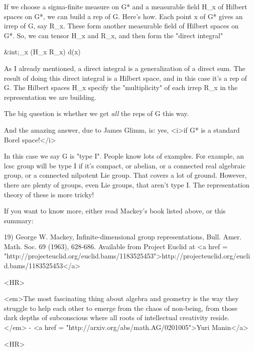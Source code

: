 If we choose a sigma-finite measure \mu  on G* and a measurable field
H_{x} of Hilbert spaces on G*, we can build a rep of G.
Here's how.  Each point x of G* gives an irrep of G, say
R_{x}.  These form another measurable field of Hilbert spaces
on G*.  So, we can tensor H_{x} and R_{x}, and then
form the "direct integral"

&int;_{x}  (H_{x} \otimes  R_{x}) d\mu (x)

As I already mentioned, a direct integral is a generalization of a
direct sum.  The result of doing this direct integral is a Hilbert
space, and in this case it's a rep of G.  The Hilbert spaces
H_{x} specify the "multiplicity" of each irrep
R_{x} in the representation we are building.

The big question is whether we get \emph{all} the reps of G this way.

And the amazing answer, due to James Glimm, is: yes, <i>if G* is a
standard Borel space!</i>

In this case we say G is "type I".  People know lots of
examples.  For example, an lcsc group will be type I if it's compact,
or abelian, or a connected real algebraic group, or a connected
nilpotent Lie group.  That covers a lot of ground.  However, there are
plenty of groups, even Lie groups, that aren't type I.  The
representation theory of these is more tricky!

If you want to know more, either read Mackey's book listed above, 
or this summary:

19) George W. Mackey, Infinite-dimensional group representations,
Bull. Amer. Math. Soc. 69 (1963), 628-686.  Available from Project
Euclid at <a href =
"http://projecteuclid.org/euclid.bams/1183525453">http://projecteuclid.org/euclid.bams/1183525453</a>

<HR>

<em>The most fascinating thing about algebra and geometry is the way 
they struggle to help each other to emerge from the chaos of non-being, 
from those dark depths of subconscious where all roots of intellectual 
creativity reside.</em> - <a href = "http://arxiv.org/abs/math.AG/0201005">Yuri
Manin</a>

<HR>



